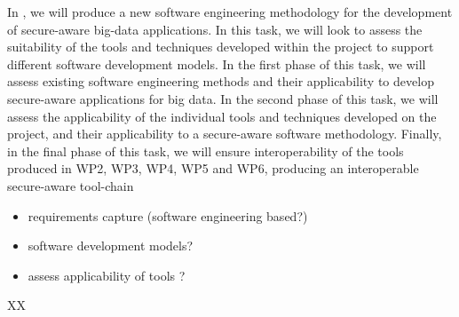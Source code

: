 \begin{Workpackage}{\thewpno}
\begin{Task}
	In \theTask, we will produce a new software engineering methodology for the development of secure-aware big-data applications. In this task, we will look to assess the suitability of the tools and techniques developed within the project to support different software development models. 
	In the first phase of this task, we will assess existing  software engineering methods and their applicability to develop secure-aware applications for big data.
	In the second phase of this task, we will assess the applicability of the individual tools and techniques developed on the \TheProject{} project, and their applicability to a secure-aware software methodology. 
	Finally, in the final phase of this task, we will ensure interoperability of the tools produced in WP2, WP3, WP4, WP5 and WP6, producing an interoperable secure-aware tool-chain
	\begin{itemize}
		\item requirements capture (software engineering based?)
		\item software development models?
		\item assess applicability of tools ?
	\end{itemize}
\end{Task}

%	
%	
%	




\begin{WPDeliverables}
  \begin{compactitem}
    \item XX
\end{compactitem}
\end{WPDeliverables}
\end{Workpackage}
